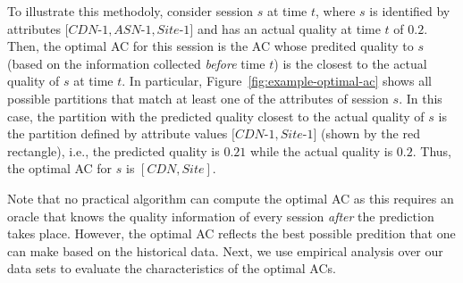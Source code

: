 To illustrate this methodoly, consider session $s$ at time $t$, where
$s$ is identified by attributes $[CDN$-$1, ASN$-$1, Site$-$1]$ and has
an actual quality at time $t$ of $0.2$. Then, the optimal AC for this
session is the AC whose predited quality to $s$ (based on the
information collected \emph{before} time $t$) is the closest to the
actual quality of $s$ at time $t$.  In particular,
Figure~\ref{fig:example-optimal-ac} shows all possible partitions that
match at least one of the attributes of session $s$. In this case, the
partition with the predicted quality closest to the actual quality of
$s$ is the partition defined by attribute values $[CDN$-$1, Site$-$1]$
(shown by the red rectangle), i.e., the predicted quality is $0.21$
while the actual quality is $0.2$. Thus, the optimal AC for $s$ is
$[CDN, Site]$.


Note that no practical algorithm can compute the optimal AC as this
requires an oracle that knows the quality information of every session
\emph{after} the prediction takes place. However, the optimal AC
reflects the best possible predition that one can make based on the
historical data. Next, we use empirical analysis over our data sets to
evaluate the characteristics of the optimal ACs.

